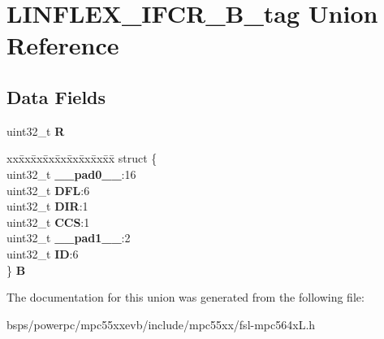 \hypertarget{unionLINFLEX__IFCR__32B__tag}{}\section{L\+I\+N\+F\+L\+E\+X\+\_\+\+I\+F\+C\+R\+\_\+B\+\_\+tag Union Reference}
\label{unionLINFLEX__IFCR__32B__tag}
\subsection*{Data Fields}
\begin{DoxyCompactItemize}
\item 
\mbox{\label{unionLINFLEX__IFCR__32B__tag_a1798d883f37761291630d20a0c65ff54}} 
uint32\+\_\+t {\bfseries R}
\item 
\mbox{\label{unionLINFLEX__IFCR__32B__tag_a28eb1b03663fa1aab3ae51e8b9b274dd}} 
\begin{tabbing}
xx\=xx\=xx\=xx\=xx\=xx\=xx\=xx\=xx\=\kill
struct \{\\
\>uint32\_t {\bfseries \_\_pad0\_\_}:16\\
\>uint32\_t {\bfseries DFL}:6\\
\>uint32\_t {\bfseries DIR}:1\\
\>uint32\_t {\bfseries CCS}:1\\
\>uint32\_t {\bfseries \_\_pad1\_\_}:2\\
\>uint32\_t {\bfseries ID}:6\\
\} {\bfseries B}\\

\end{tabbing}\end{DoxyCompactItemize}


The documentation for this union was generated from the following file\+:\begin{DoxyCompactItemize}
\item 
bsps/powerpc/mpc55xxevb/include/mpc55xx/fsl-\/mpc564x\+L.\+h\end{DoxyCompactItemize}
